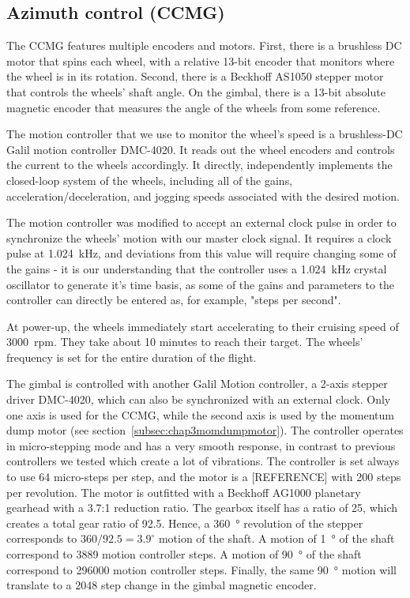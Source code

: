 \subsection{Azimuth control (CCMG)}

The CCMG features multiple encoders and motors. First, there is a brushless DC motor that spins each wheel, with a relative 13-bit encoder that monitors where the wheel is in its rotation. Second, there is a Beckhoff AS1050 stepper motor that controls the wheels' shaft angle. On the gimbal, there is a 13-bit  absolute magnetic encoder that measures the angle of the wheels from some reference. 

The motion controller that we use to monitor the wheel's speed is a brushless-DC Galil motion controller DMC-4020. It reads out the wheel encoders and controls the current to the wheels accordingly. It directly, independently implements the closed-loop system of the wheels, including all of the gains, acceleration/deceleration, and jogging speeds associated with the desired motion.

The motion controller was modified to accept an external clock pulse in order to synchronize the wheels' motion with our master clock signal. It requires a clock pulse at \SI{1.024}{\kilo\hertz}, and deviations from this value will require changing some of the gains - it is our understanding that the controller uses a \SI{1.024}{\kilo\hertz} crystal oscillator to generate it's time basis, as some of the gains and parameters to the controller can directly be entered as, for example, "steps per second". 

At power-up, the wheels immediately start accelerating to their cruising speed of 3000~rpm. They take about 10 minutes to reach their target. The wheels' frequency is set for the entire duration of the flight.

The gimbal is controlled with another Galil Motion controller, a 2-axis stepper driver DMC-4020, which can also be synchronized with an external clock. Only one axis is used for the CCMG, while the second axis is used by the momentum dump motor (see section~\ref{subsec:chap3momdumpmotor}). The controller operates in micro-stepping mode and has a very smooth response, in contrast to previous controllers we tested which create a lot of vibrations. The controller is set always to use 64 micro-steps per step, and the motor is a [REFERENCE] with 200 steps per revolution. The motor is outfitted with a Beckhoff AG1000 planetary gearhead with a 3.7:1 reduction ratio. The gearbox itself has a ratio of 25, which creates a total gear ratio of 92.5. Hence, a \SI{360}{\degree} revolution of the stepper corresponds to $360/92.5=3.9^\circ$ motion of the shaft. A motion of \SI{1}{\degree} of the shaft correspond to 3889 motion controller steps. A motion of \SI{90}{\degree} of the shaft correspond to 296000 motion controller steps. Finally, the same \SI{90}{\degree} motion will translate to a 2048 step change in the gimbal magnetic encoder.

